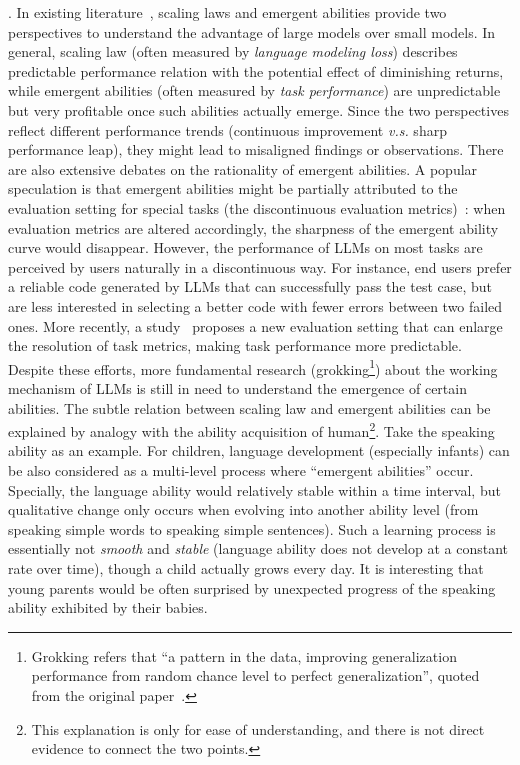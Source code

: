 {
. In existing literature~\cite{Kaplan-arxiv-2020-Scaling,Hoffmann-arxiv-2022-Training,Wei-arxiv-2022-Emergent}, scaling laws and emergent abilities  provide two perspectives to understand the advantage of large models over small models. In general, scaling law (often measured by \emph{language modeling loss}) describes predictable performance relation with the potential effect of diminishing returns, while emergent abilities (often measured by \emph{task performance}) are unpredictable but very profitable once such abilities actually emerge.  
Since the two perspectives reflect different performance trends (continuous improvement \emph{v.s.} sharp performance leap), they might lead to misaligned findings or observations. 
There are also extensive debates on the rationality of emergent abilities. 
A popular speculation is that  emergent abilities might be partially attributed to the evaluation setting for special tasks (\eg the discontinuous evaluation metrics)~\cite{Srivastava-arxiv-2022-Beyond,Schaeffer-arXiv-2023-mirage}: when evaluation metrics are altered accordingly, the sharpness of the emergent ability curve would disappear. 
However, the performance of LLMs on most tasks are perceived by users naturally in a discontinuous way.  
For instance, end users prefer a reliable code generated by LLMs that can successfully pass  the test case, but are less interested in selecting a better code with fewer errors between two failed ones.     
More recently, a study~\cite{Hu-arXiv-2023-unlock} proposes a new evaluation setting that can enlarge the resolution of task metrics, making task performance more predictable. Despite these efforts, more fundamental research (\eg grokking\footnote{Grokking refers that ``a pattern in the data, improving generalization performance from random chance level to perfect generalization'', quoted from the original paper~\cite{Power-arxiv-2022-grokking}.}) about the working mechanism of LLMs is still in need to understand the emergence of certain abilities. The subtle relation  between scaling law and emergent abilities can be explained by analogy with the ability acquisition of human\footnote{This explanation is only for ease of understanding, and there is not direct evidence to connect the two points. }.
Take the speaking ability as an example. For children,   language development  (especially infants) can be also considered as a multi-level  process where ``emergent abilities'' occur. Specially, the language ability would relatively stable within a time interval, but qualitative change only occurs when evolving into another ability level (\eg from speaking simple words to speaking simple sentences). Such a learning process is essentially not  \emph{smooth} and \emph{stable} (\ie language ability does not develop at a constant rate over time), though a child actually grows every day. It is interesting that young parents would be often surprised by unexpected progress of the speaking ability exhibited by their babies.
}


